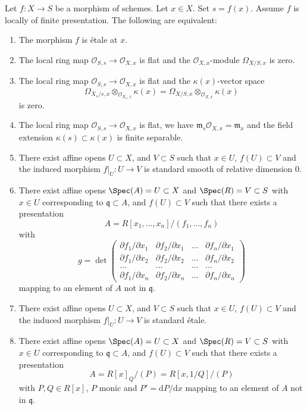 \begin{lemma}
\label{lemma-etale-at-point}
Let $f : X \to S$ be a morphism of schemes.
Let $x \in X$.
Set $s = f(x)$.
Assume $f$ is locally of finite presentation.
The following are equivalent:
\begin{enumerate}
\item The morphism $f$ is \'etale at $x$.
\item The local ring map $\mathcal{O}_{S, s} \to \mathcal{O}_{X, x}$
is flat and the $\mathcal{O}_{X, x}$-module $\Omega_{X/S, x}$
is zero.
\item The local ring map $\mathcal{O}_{S, s} \to \mathcal{O}_{X, x}$
is flat and the $\kappa(x)$-vector space
$$
\Omega_{X_s/s, x} \otimes_{\mathcal{O}_{X_s, x}} \kappa(x) =
\Omega_{X/S, x} \otimes_{\mathcal{O}_{X, x}} \kappa(x)
$$
is zero.
\item The local ring map $\mathcal{O}_{S, s} \to \mathcal{O}_{X, x}$
is flat, we have $\mathfrak m_s\mathcal{O}_{X, x} = \mathfrak m_x$ and
the field extension $\kappa(s) \subset \kappa(x)$ is finite
separable.
\item There exist affine opens $U \subset X$,
and $V \subset S$ such that $x \in U$, $f(U) \subset V$ and the
induced morphism $f|_U : U \to V$ is standard smooth
of relative dimension $0$.
\item There exist affine opens $\Spec(A) = U \subset X$
and $\Spec(R) = V \subset S$ with $x \in U$ corresponding
to $\mathfrak q \subset A$, and $f(U) \subset V$
such that there exists a presentation
$$
A = R[x_1, \ldots, x_n]/(f_1, \ldots, f_n)
$$
with
$$
g =
\det
\left(
\begin{matrix}
\partial f_1/\partial x_1 &
\partial f_2/\partial x_1 &
\ldots &
\partial f_n/\partial x_1 \\
\partial f_1/\partial x_2 &
\partial f_2/\partial x_2 &
\ldots &
\partial f_n/\partial x_2 \\
\ldots & \ldots & \ldots & \ldots \\
\partial f_1/\partial x_n &
\partial f_2/\partial x_n &
\ldots &
\partial f_n/\partial x_n
\end{matrix}
\right)
$$
mapping to an element of $A$ not in $\mathfrak q$.
\item There exist affine opens $U \subset X$,
and $V \subset S$ such that $x \in U$, $f(U) \subset V$ and the
induced morphism $f|_U : U \to V$ is standard \'etale.
\item There exist affine opens $\Spec(A) = U \subset X$
and $\Spec(R) = V \subset S$ with $x \in U$ corresponding
to $\mathfrak q \subset A$, and $f(U) \subset V$
such that there exists a presentation
$$
A = R[x]_Q/(P) = R[x, 1/Q]/(P)
$$
with $P, Q \in R[x]$, $P$ monic and $P' = \text{d}P/\text{d}x$ mapping to
an element of $A$ not in $\mathfrak q$.
\end{enumerate}
\end{lemma}

